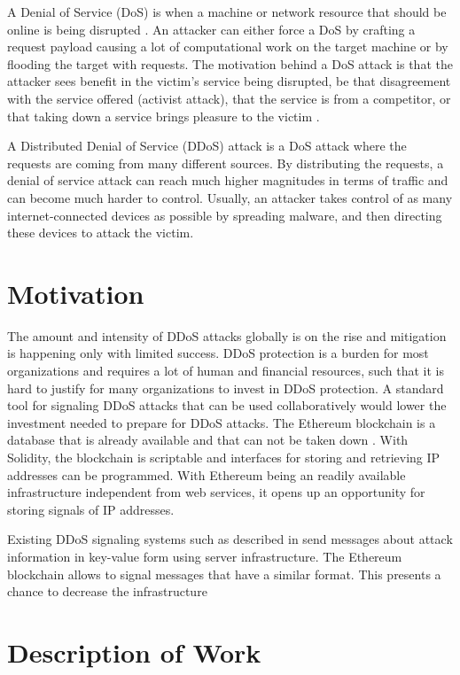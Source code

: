 A Denial of Service (DoS) is when a machine or network resource that should be online is being disrupted \cite{USCERT}. An attacker can either force a DoS by crafting a request payload causing a lot of computational work on the target machine or by flooding the target with requests. The motivation behind a DoS attack is that the attacker sees benefit in the victim's service being disrupted, be that disagreement with the service offered (activist attack), that the service is from a competitor, or that taking down a service brings pleasure to the victim \cite{DDoSOverview}.

A Distributed Denial of Service (DDoS) attack is a DoS attack where the requests are coming from many different sources. By distributing the requests, a denial of service attack can reach much higher magnitudes in terms of traffic and can become much harder to control.
Usually, an attacker takes control of as many internet-connected devices as possible by spreading malware, and then directing these devices to attack the victim.

\section{Motivation}

The amount and intensity of DDoS attacks globally is on the rise \cite{DDoSRise} and mitigation is happening only with limited success. 
DDoS protection is a burden for most organizations and requires a lot of human and financial resources, such that it is hard to justify for many organizations to invest in DDoS protection. A standard tool for signaling DDoS attacks that can be used collaboratively would lower the investment needed to prepare for DDoS attacks.
The Ethereum blockchain is a database that is already available and that can not be taken down \cite{Ethereum}. With Solidity, the blockchain is scriptable and interfaces for storing and retrieving IP addresses can be programmed. With Ethereum being an readily available infrastructure independent from web services, it opens up an opportunity for storing signals of IP addresses.

Existing DDoS signaling systems such as described in \cite{IETFDraft} send messages about attack information in key-value form using server infrastructure. The Ethereum blockchain allows to signal messages that have a similar format. This presents a chance to decrease the infrastructure

\section{Description of Work}

